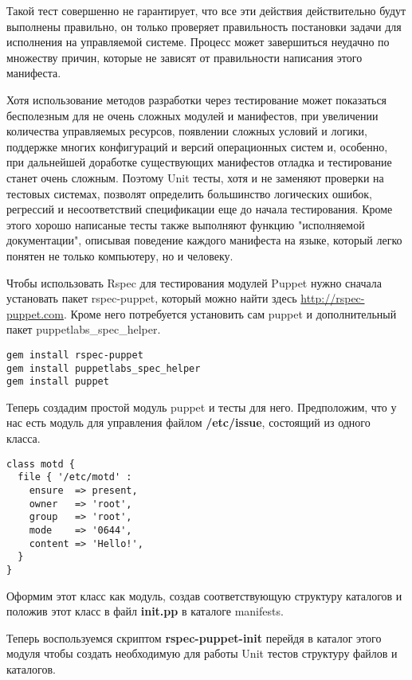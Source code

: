 Такой тест совершенно не гарантирует, что все эти действия действительно будут выполнены правильно, он только проверяет правильность постановки задачи для исполнения на управляемой системе. Процесс может завершиться неудачно по множеству причин, которые не зависят от правильности написания этого манифеста.

Хотя использование методов разработки через тестирование может показаться бесполезным для не очень сложных модулей и манифестов, при увеличении количества управляемых ресурсов, появлении сложных условий и логики, поддержке многих конфигураций и версий операционных систем и, особенно, при дальнейшей доработке существующих манифестов отладка и тестирование станет очень сложным. Поэтому Unit тесты, хотя и не заменяют проверки на тестовых системах, позволят определить большинство логических ошибок, регрессий и несоответствий спецификации еще до начала тестирования. Кроме этого хорошо написаные тесты также выполняют функцию "исполняемой документации", описывая поведение каждого манифеста на языке, который легко понятен не только компьютеру, но и человеку.

Чтобы использовать Rspec для тестирования модулей Puppet нужно сначала установать пакет rspec-puppet, который можно найти здесь \url{http://rspec-puppet.com}. Кроме него потребуется установить сам puppet и дополнительный пакет puppetlabs\_spec\_helper.

\begin{verbatim}
gem install rspec-puppet
gem install puppetlabs_spec_helper
gem install puppet
\end{verbatim}

Теперь создадим простой модуль puppet и тесты для него. Предположим, что у нас есть модуль для управления файлом \textbf{/etc/issue}, состоящий из одного класса.

\begin{verbatim}
class motd {
  file { '/etc/motd' :
    ensure  => present,
    owner   => 'root',
    group   => 'root',
    mode    => '0644',
    content => 'Hello!',
  }
}
\end{verbatim}

Оформим этот класс как модуль, создав соответствующую структуру каталогов и положив этот класс в файл \textbf{init.pp} в каталоге manifests.


Теперь воспользуемся скриптом \textbf{rspec-puppet-init} перейдя в каталог этого модуля чтобы создать необходимую для работы Unit тестов структуру файлов и каталогов.

